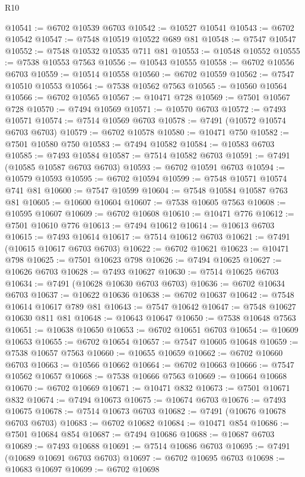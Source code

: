 \begin{lexlean}{R10}
\begin{coremodule}
{{{{{{{{{{{{{{{{{{{{{{{{{{{{{{{{{{{{{{{{{{{{{{{{{{{{{{{{{{{{{{{{{{{{{{{{{{{{{{{{{{{{@10541 := @6702 @10539 @6703
@10542 := @10527 @10541
@10543 := @6702 @10542
@10547 := @7548 @10519 @10522 @689 @81
@10548 := @7547 @10547
@10552 := @7548 @10532 @10535 @711 @81
@10553 := @10548 @10552
@10555 := @7538 @10553 @7563
@10556 := @10543 @10555
@10558 := @6702 @10556 @6703
@10559 := @10514 @10558
@10560 := @6702 @10559
@10562 := @7547 @10510 @10553
@10564 := @7538 @10562 @7563
@10565 := @10560 @10564
@10566 := @6702 @10565
@10567 := @10471 @728
@10569 := @7501 @10567 @728
@10570 := @7494 @10569
@10571 := @10570 @6703
@10572 := @7493 @10571
@10574 := @7514 @10569 @6703
@10578 := @7491 (@10572 @10574 @6703 @6703)
@10579 := @6702 @10578
@10580 := @10471 @750
@10582 := @7501 @10580 @750
@10583 := @7494 @10582
@10584 := @10583 @6703
@10585 := @7493 @10584
@10587 := @7514 @10582 @6703
@10591 := @7491 (@10585 @10587 @6703 @6703)
@10593 := @6702 @10591 @6703
@10594 := @10579 @10593
@10595 := @6702 @10594
@10599 := @7548 @10571 @10574 @741 @81
@10600 := @7547 @10599
@10604 := @7548 @10584 @10587 @763 @81
@10605 := @10600 @10604
@10607 := @7538 @10605 @7563
@10608 := @10595 @10607
@10609 := @6702 @10608
@10610 := @10471 @776
@10612 := @7501 @10610 @776
@10613 := @7494 @10612
@10614 := @10613 @6703
@10615 := @7493 @10614
@10617 := @7514 @10612 @6703
@10621 := @7491 (@10615 @10617 @6703 @6703)
@10622 := @6702 @10621
@10623 := @10471 @798
@10625 := @7501 @10623 @798
@10626 := @7494 @10625
@10627 := @10626 @6703
@10628 := @7493 @10627
@10630 := @7514 @10625 @6703
@10634 := @7491 (@10628 @10630 @6703 @6703)
@10636 := @6702 @10634 @6703
@10637 := @10622 @10636
@10638 := @6702 @10637
@10642 := @7548 @10614 @10617 @789 @81
@10643 := @7547 @10642
@10647 := @7548 @10627 @10630 @811 @81
@10648 := @10643 @10647
@10650 := @7538 @10648 @7563
@10651 := @10638 @10650
@10653 := @6702 @10651 @6703
@10654 := @10609 @10653
@10655 := @6702 @10654
@10657 := @7547 @10605 @10648
@10659 := @7538 @10657 @7563
@10660 := @10655 @10659
@10662 := @6702 @10660 @6703
@10663 := @10566 @10662
@10664 := @6702 @10663
@10666 := @7547 @10562 @10657
@10668 := @7538 @10666 @7563
@10669 := @10664 @10668
@10670 := @6702 @10669
@10671 := @10471 @832
@10673 := @7501 @10671 @832
@10674 := @7494 @10673
@10675 := @10674 @6703
@10676 := @7493 @10675
@10678 := @7514 @10673 @6703
@10682 := @7491 (@10676 @10678 @6703 @6703)
@10683 := @6702 @10682
@10684 := @10471 @854
@10686 := @7501 @10684 @854
@10687 := @7494 @10686
@10688 := @10687 @6703
@10689 := @7493 @10688
@10691 := @7514 @10686 @6703
@10695 := @7491 (@10689 @10691 @6703 @6703)
@10697 := @6702 @10695 @6703
@10698 := @10683 @10697
@10699 := @6702 @10698
}}}}}}}}}}}}}}}}}}}}}}}}}}}}}}}}}}}}}}}}}}}}}}}}}}}}}}}}}}}}}}}}}}}}}}}}}}}}}}}}}}}}
\end{coremodule}
\end{lexlean}
